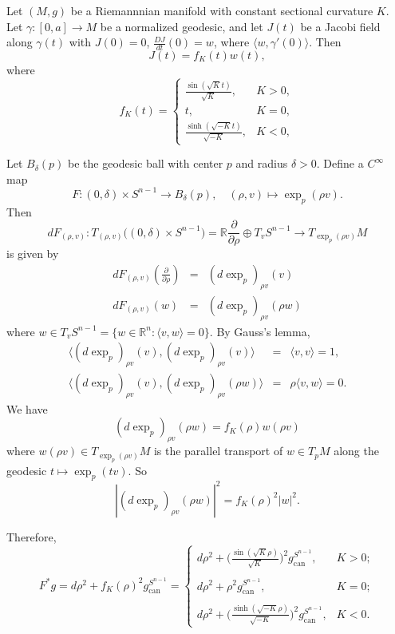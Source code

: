 \documentclass{amsart}
\numberwithin{equation}{section}
\newcommand{\bR}{\mathbb{R}}
\newcommand{\can}{\mathrm{can}}
\theoremstyle{definition}
\theoremstyle{theorem}
\begin{document}
Let $(M,g)$ be a Riemannnian manifold with constant sectional curvature $K$. 
Let $\gamma:[0,a]\to M$ be a normalized geodesic, and let $J(t)$ be a Jacobi field
along $\gamma(t)$ with $J(0)=0$, $\frac{DJ}{dt}(0)= w$, where $\langle w, \gamma'(0)\rangle$. 
Then 
$$
J(t)= f_K(t) w(t),
$$
where 
$$
f_K(t)=\begin{cases}
\frac{\sin(\sqrt{K} t)}{\sqrt{K}}, & K>0,\\
t, & K=0,\\
\frac{\sinh(\sqrt{-K} t)}{\sqrt{-K}}, & K<0,
\end{cases}
$$

Let $B_\delta(p)$ be the geodesic ball with center $p$ and radius $\delta>0$.
Define a $C^\infty$ map 
$$
F:(0,\delta)\times S^{n-1} \to B_\delta(p),\quad (\rho,v)\mapsto \exp_p(\rho v).
$$
Then
$$
dF_{(\rho,v)}: T_{(\rho,v)} \Big( (0,\delta)\times S^{n-1} \Big) = \bR \frac{\partial}{\partial \rho}\oplus T_v S^{n-1}
\to T_{\exp_p(\rho v)}M
$$
is given by 
\begin{eqnarray*}
dF_{(\rho,v)} (\frac{\partial}{\partial \rho}) &=& (d\exp_p)_{\rho v}(v)\\
dF_{(\rho,v)} (w) &=& (d\exp_p)_{\rho v}(\rho w)
\end{eqnarray*}
where $w\in T_v S^{n-1}=\{ w\in \bR^n: \langle v,w\rangle =0\}$. By Gauss's lemma,
\begin{eqnarray*}
\langle  (d\exp_p)_{\rho v}(v),  (d\exp_p)_{\rho v}(v)\rangle &=& \langle v, v\rangle =1,\\
 \langle (d\exp_p)_{\rho v}(v), (d\exp_p)_{\rho v}(\rho w)\rangle &=& \rho \langle v, w\rangle =0.
\end{eqnarray*}
We have 
$$
(d\exp_p)_{\rho v} (\rho w)= f_K(\rho) w(\rho v)
$$
where $w(\rho v)\in T_{\exp_p(\rho v)} M$ is the parallel transport of $w\in T_p M$ along
the geodesic $t \mapsto \exp_p(tv)$. So
$$
|(d\exp_p)_{\rho v} (\rho w)|^2 = f_K(\rho)^2 |w|^2. 
$$

Therefore,
$$
F^* g = d\rho^2 + f_K(\rho)^2 g_{\can}^{S^{n-1}}=\begin{cases}
\displaystyle{ d\rho^2+\Big(\frac{\sin(\sqrt{K}\rho)}{\sqrt{K}}\Big)^2 g_\can^{S^{n-1}} }, & K>0;\\
& \\
\displaystyle{ d\rho^2+\rho^2 g_\can^{S^{n-1}} }, & K=0;\\
& \\
\displaystyle{ d\rho^2+\Big(\frac{\sinh(\sqrt{-K}\rho)}{\sqrt{-K}}\Big)^2 g_\can^{S^{n-1}} },&  K<0.
\end{cases} 
$$
\end{document}
